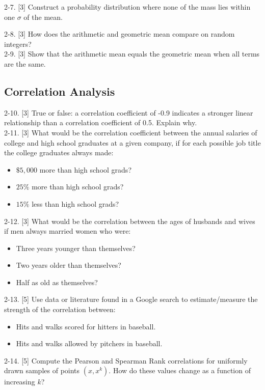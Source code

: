 \documentclass[10pt]{article}
\begin{document}
2-7. [3] Construct a probability distribution where none of the mass lies within one $\sigma$ of the mean.

2-8. [3] How does the arithmetic and geometric mean compare on random integers?\\

2-9. [3] Show that the arithmetic mean equals the geometric mean when all terms are the same.

\subsection{Correlation Analysis}
2-10. [3] True or false: a correlation coefficient of -0.9 indicates a stronger linear relationship than a correlation coefficient of 0.5. Explain why.\\[0pt]

2-11. [3] What would be the correlation coefficient between the annual salaries of college and high school graduates at a given company, if for each possible job title the college graduates always made:
\begin{itemize}
  \item $ \$ 5,000$ more than high school grads?
  \item $ 25 \%$ more than high school grads?
  \item $ 15 \%$ less than high school grads?
\end{itemize}

2-12. [3] What would be the correlation between the ages of husbands and wives if men always married women who were:
\begin{itemize}
  \item Three years younger than themselves?
  \item Two years older than themselves?
  \item Half as old as themselves?
\end{itemize}

2-13. [5] Use data or literature found in a Google search to estimate/measure the strength of the correlation between:
\begin{itemize}
  \item Hits and walks scored for hitters in baseball.
  \item Hits and walks allowed by pitchers in baseball.
\end{itemize}

2-14. [5] Compute the Pearson and Spearman Rank correlations for uniformly drawn samples of points $(x, x^k)$. How do these values change as a function of increasing $k$?
\end{document}
